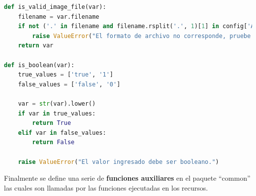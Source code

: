 \begin{lstlisting}[language=Python]
def is_valid_image_file(var):
    filename = var.filename
    if not ('.' in filename and filename.rsplit('.', 1)[1] in config['ALLOWED_IMG_EXTENSIONS']):
        raise ValueError("El formato de archivo no corresponde, pruebe con \"jpg\"")
    return var

def is_boolean(var):
    true_values = ['true', '1']
    false_values = ['false', '0']

    var = str(var).lower()
    if var in true_values:
        return True
    elif var in false_values:
        return False

    raise ValueError("El valor ingresado debe ser booleano.")
\end{lstlisting}

Finalmente se define una serie de \textbf{funciones auxiliares} en el paquete ``common'' las cuales son llamadas por las funciones ejecutadas en los recursos.

